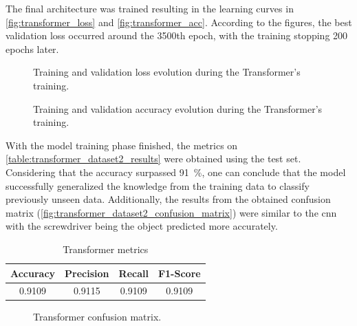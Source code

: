 The final architecture was trained resulting in the learning curves in \autoref{fig:transformer_loss} and \autoref{fig:transformer_acc}. According to the figures, the best validation loss occurred around the 3500th epoch, with the training stopping 200 epochs later.

\begin{figure}[ht]
    \centering
    {\fontsize{9.5}{12}\selectfont}
    \caption{Training and validation loss evolution during the Transformer's training.}
    \label{fig:transformer_loss}
\end{figure}

\begin{figure}[ht]
    \centering
    {\fontsize{9.5}{12}\selectfont}
    \caption{Training and validation accuracy evolution during the Transformer's training.}
    \label{fig:transformer_acc}
\end{figure}

With the model training phase finished, the metrics on \autoref{table:transformer_dataset2_results} were obtained using the test set. Considering that the accuracy surpassed \SI{91}{\percent}, one can conclude that the model successfully generalized the knowledge from the training data to classify previously unseen data. Additionally, the results from the obtained confusion matrix (\autoref{fig:transformer_dataset2_confusion_matrix}) were similar to the \acs{cnn} with the screwdriver being the object predicted more accurately.

\begin{table}[ht]
    \centering
    \caption{Transformer metrics}
    \label{table:transformer_dataset2_results}
    \begin{tabular}{cccc}
        \toprule
        Accuracy & Precision & Recall & F1-Score \\
        \midrule
        0.9109 & 0.9115 & 0.9109 & 0.9109 \\
        \bottomrule
    \end{tabular}
\end{table}

\begin{figure}[ht]
    \centering
    {\fontsize{10}{12}\selectfont}
    \caption{Transformer confusion matrix.}
    \label{fig:transformer_dataset2_confusion_matrix}
\end{figure}

